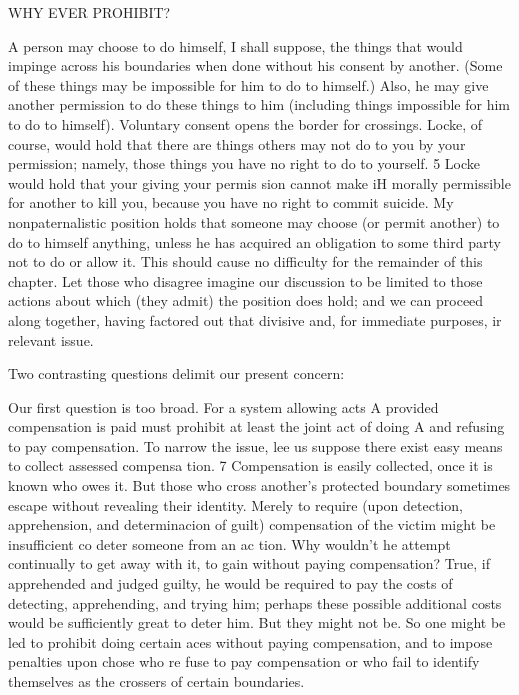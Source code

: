 \documentclass[11pt,openany]{book}
\begin{document}
WHY EVER PROHIBIT? 

A person may choose to do himself, I shall suppose, the things that would impinge across his boundaries when done without his consent by another. (Some of these things may be impossible for him to do to himself.) Also, he may give another permission to do these things to him (including things impossible for him to do to himself). Voluntary consent opens the border for crossings. Locke, of course, would hold that there are things others may not do to you by your permission; namely, those things you have no right to do to yourself. 5 Locke would hold that your giving your permis sion cannot make iH morally permissible for another to kill you, because you have no right to commit suicide. My nonpaternalistic position holds that someone may choose (or permit another) to do to himself anything, unless he has acquired an obligation to some third party not to do or allow it. This should cause no difficulty for the remainder of this chapter. Let those who disagree imagine our discussion to be limited to those actions about which (they admit) the position does hold; and we can proceed along together, having factored out that divisive and, for immediate purposes, ir relevant issue. 

Two contrasting questions delimit our present concern: 

Our first question is too broad. For a system allowing acts A provided compensation is paid must prohibit at least the joint act of doing A and refusing to pay compensation. To narrow the issue, lee us suppose there exist easy means to collect assessed compensa tion. 7 Compensation is easily collected, once it is known who owes it. But those who cross another's protected boundary sometimes escape without revealing their identity. Merely to require (upon detection, apprehension, and determinacion of guilt) compensation of the victim might be insufficient co deter someone from an ac tion. Why wouldn't he attempt continually to get away with it, to gain without paying compensation? True, if apprehended and judged guilty, he would be required to pay the costs of detecting, apprehending, and trying him; perhaps these possible additional costs would be sufficiently great to deter him. But they might not be. So one might be led to prohibit doing certain aces without paying compensation, and to impose penalties upon chose who re fuse to pay compensation or who fail to identify themselves as the crossers of certain boundaries. 
\end{document}
